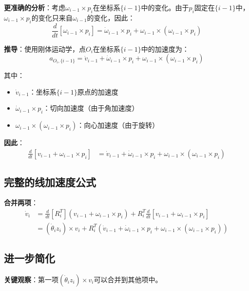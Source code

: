 \documentclass[12pt,a4paper]{article}
\begin{document}
\textbf{更准确的分析}：考虑$\omega_{i-1} \times p_i$在坐标系$\{i-1\}$中的变化。由于$p_i$固定在$\{i-1\}$中，$\omega_{i-1} \times p_i$的变化只来自$\omega_{i-1}$的变化，因此：
\begin{equation}
\frac{d}{dt}[\omega_{i-1} \times p_i] = \dot{\omega}_{i-1} \times p_i + \omega_{i-1} \times (\omega_{i-1} \times p_i)
\end{equation}

\textbf{推导}：使用刚体运动学，点$O_i$在坐标系$\{i-1\}$中的加速度为：
\begin{equation}
a_{O_i, \{i-1\}} = \dot{v}_{i-1} + \dot{\omega}_{i-1} \times p_i + \omega_{i-1} \times (\omega_{i-1} \times p_i)
\end{equation}

其中：
\begin{itemize}
\item $\dot{v}_{i-1}$：坐标系$\{i-1\}$原点的加速度
\item $\dot{\omega}_{i-1} \times p_i$：切向加速度（由于角加速度）
\item $\omega_{i-1} \times (\omega_{i-1} \times p_i)$：向心加速度（由于旋转）
\end{itemize}

\textbf{因此}：
\begin{align}
\frac{d}{dt}[v_{i-1} + \omega_{i-1} \times p_i] &= \dot{v}_{i-1} + \dot{\omega}_{i-1} \times p_i + \omega_{i-1} \times (\omega_{i-1} \times p_i)
\end{align}

\subsection{完整的线加速度公式}

\textbf{合并两项}：
\begin{align}
\dot{v}_i &= \frac{d}{dt}[R_i^T] (v_{i-1} + \omega_{i-1} \times p_i) + R_i^T \frac{d}{dt}[v_{i-1} + \omega_{i-1} \times p_i] \\
&= (\dot{\theta}_i z_i) \times v_i + R_i^T (\dot{v}_{i-1} + \dot{\omega}_{i-1} \times p_i + \omega_{i-1} \times (\omega_{i-1} \times p_i))
\end{align}

\subsection{进一步简化}

\textbf{关键观察}：第一项$(\dot{\theta}_i z_i) \times v_i$可以合并到其他项中。
\end{document}
